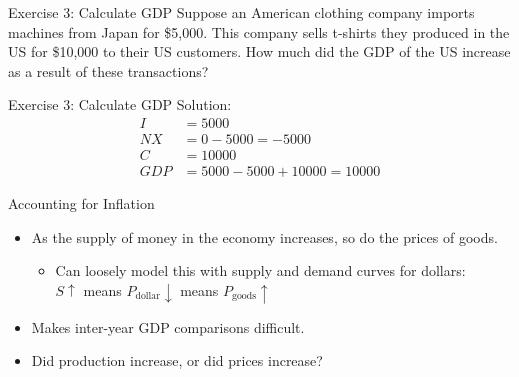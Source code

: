 \documentclass[9pt]{beamer}
\begin{document}
\begin{frame}{Exercise 3: Calculate GDP}
    Suppose an American clothing company imports machines from Japan for \$5,000. This company sells t-shirts they produced in the US for \$10,000 to their US customers. How much did the GDP of the US increase as a result of these transactions?
    \vspace{2in}
\end{frame}

\begin{frame}{Exercise 3: Calculate GDP}
    Solution: 
    \begin{align*}
        I&=5000\\
        NX&=0-5000=-5000\\
        C&=10000\\
        GDP&=5000-5000+10000=10000
    \end{align*}
\end{frame}

\begin{frame}{Accounting for Inflation}
    \begin{itemize}
        \item As the supply of money in the economy increases, so do the prices of goods.
        \vspace{5pt}
        \begin{itemize}
            \item Can loosely model this with supply and demand curves for dollars:\\
            \vspace{3pt}
            $S \uparrow$ means $P_{\text{dollar}} \downarrow$ means $P_{\text{goods}} \uparrow$
            \vspace{10pt}
        \end{itemize}
        \item Makes inter-year GDP comparisons difficult.
        \vspace{10pt}
        \item Did production increase, or did prices increase?
    \end{itemize}
\end{frame}
\end{document}

